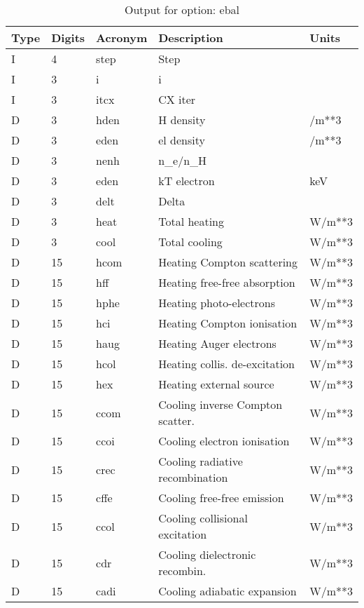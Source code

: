 \begin{table}[!p]
\caption{Output for option: ebal}
\label{tabout:ebal}
\begin{tabular}{lllll}
\hline
Type & Digits & Acronym & Description & Units \\ 
\hline
I &  4 & step & Step                             &                  \\
I &  3 & i    & i                                &                  \\
I &  3 & itcx & CX iter                          &                  \\
D &  3 & hden & H density                        & /m**3            \\
D &  3 & eden & el density                       & /m**3            \\
D &  3 & nenh & n_e/n_H                          &                  \\
D &  3 & eden & kT electron                      & keV              \\
D &  3 & delt & Delta                            &                  \\
D &  3 & heat & Total heating                    & W/m**3           \\
D &  3 & cool & Total cooling                    & W/m**3           \\
D & 15 & hcom & Heating Compton scattering       & W/m**3           \\
D & 15 & hff  & Heating free-free absorption     & W/m**3           \\
D & 15 & hphe & Heating photo-electrons          & W/m**3           \\
D & 15 & hci  & Heating Compton ionisation       & W/m**3           \\
D & 15 & haug & Heating Auger electrons          & W/m**3           \\
D & 15 & hcol & Heating collis. de-excitation    & W/m**3           \\
D & 15 & hex  & Heating external source          & W/m**3           \\
D & 15 & ccom & Cooling inverse Compton scatter. & W/m**3           \\
D & 15 & ccoi & Cooling electron ionisation      & W/m**3           \\
D & 15 & crec & Cooling radiative recombination  & W/m**3           \\
D & 15 & cffe & Cooling free-free emission       & W/m**3           \\
D & 15 & ccol & Cooling collisional excitation   & W/m**3           \\
D & 15 & cdr  & Cooling dielectronic recombin.   & W/m**3           \\
D & 15 & cadi & Cooling adiabatic expansion      & W/m**3           \\
\hline
\end{tabular}
\end{table}

